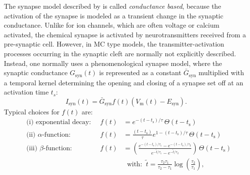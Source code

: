 The synapse model described by  is called \textit{conductance based}, because the activation of the synapse is modeled as a transient change in the synaptic conductance. Unlike for ion channels, which are often voltage or calcium activated, the chemical synapse is activated by neurotransmitters received from a pre-synaptic cell. However, in MC type models, the transmitter-activation processes occurring in the synaptic cleft are normally not explicitly described. Instead, one normally uses a phenomenological synapse model, where the synaptic conductance $G_\text{syn}(t)$ is represented as a constant $\bar{G}_\text{syn}$ multiplied with a temporal kernel determining the opening and closing of a synapse set off at an activation time $t_s$:
\begin{equation}
I_\text{syn}(t) = \bar{G}_\text{syn} f(t) \left(V_\mathrm{m}(t)-E_\text{syn} \right).
\label{eq:Neuron:chemicalsynapse}
\end{equation}
Typical choices for $f(t)$ are: 
\begin{align}
&\text{(i) exponential decay:} \;\; &f(t) &= e^{-(t-t_\text{s})/\tau}\, \Theta(t-t_\text{s}) \\
&\text{(ii) $\alpha$-function:} \;\; &f(t) &=  \frac{(t-t_\text{s})}{\tau}e^{1-(t-t_\text{s})/\tau} \, \Theta(t-t_\text{s}) \\
&\text{(iii) $\beta$-function:} \;\; &f(t) &= \left( \frac{e^{-(t-t_\text{s})/\tau_1} - e^{-(t-t_\text{s})/\tau_2} }{e^{-\tilde{t}/\tau_1} - e^{-\tilde{t}/\tau_2} } \right) \, \Theta(t-t_\text{s}) \\
&&& \;\; \text{with:} \;\; \tilde{t} = \frac{\tau_2 \tau_1}{\tau_2 - \tau_1} \log(\frac{\tau_2}{\tau_1}) \nonumber,
\label{eq:Neuron:sf4}
\end{align}
